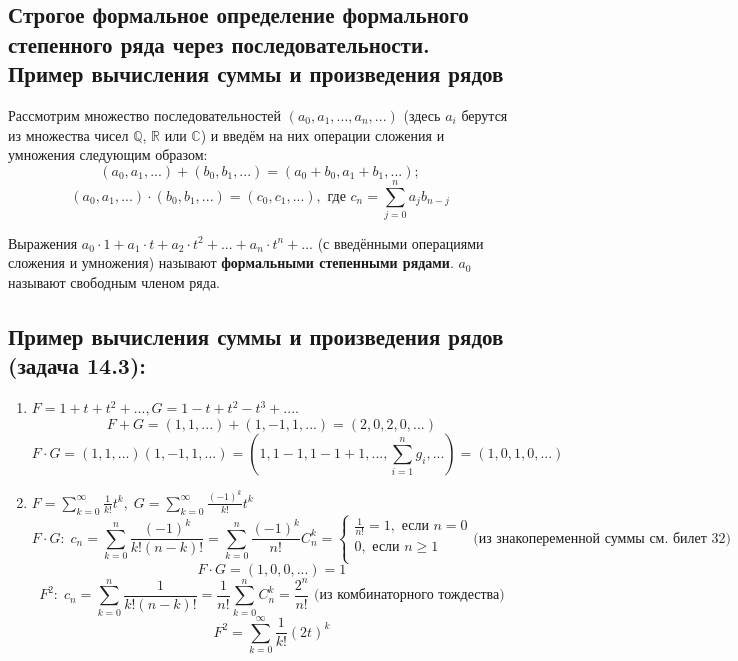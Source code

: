 \subsection*{Строгое формальное определение формального степенного ряда через последовательности. Пример вычисления суммы и произведения рядов}
\par Рассмотрим множество последовательностей $(a_0, a_1, ..., a_n, ...)$ (здесь $a_i$ берутся из множества
чисел $\mathbb{Q}$, $\mathbb{R}$ или $\mathbb{C}$) и введём на них операции сложения и умножения следующим образом:
$$(a_0, a_1, . . .) + (b_0, b_1, . . .) = (a_0 + b_0, a_1 + b_1, . . .);$$
$$(a_0, a_1, . . .) · (b_0, b_1, . . .) = (c_0, c_1, . . .),\mbox{ где } c_n =\sum\limits_{j=0}^n a_j b_{n-j}$$
\par Выражения $a_0 \cdot 1+a_1 \cdot t+a_2 \cdot t^2+. . .+a_n \cdot t^n+. . .$ (с введёнными операциями сложения и умножения) называют \textbf{формальными степенными рядами}. $a_0$ называют свободным членом ряда.
\subsection*{Пример вычисления суммы и произведения рядов (задача 14.3):}
\begin{enumerate}
    \item $F = 1 + t + t^2 + . . ., G = 1 - t + t^2 - t^3 + . . .. $
    $$F + G=(1, 1, ...) + (1, -1, 1, ...) = (2, 0, 2, 0, ...)$$
    $$F \cdot G=(1, 1, ...)(1, -1, 1, ...)=(1, 1-1, 1-1+1, ..., \sum\limits_{i=1}^n g_i, ...)=(1, 0, 1, 0,...) $$
    \item $F =\sum\limits_{k=0}^{\infty} \frac{1}{k!}t^k, \; G =\sum\limits_{k=0}^{\infty} \frac{(-1)^k}{k!}t^k$
    $$F \cdot G: \; c_n=\sum\limits_{k=0}^n \frac{(-1)^k}{k!(n-k)!}=\sum\limits_{k=0}^n \frac{(-1)^k}{n!} C_n^k=\left\{
\begin{array}{ccc}
\frac{1}{n!}=1, \mbox{ если } n=0\\
0, \mbox{ если } n \geq 1\\
\end{array}
\right. \mbox{(из знакопеременной суммы см. билет 32)}$$
$$F \cdot G = (1, 0, 0, ...)=1$$
$$F^2: \; c_n=\sum\limits_{k=0}^n \frac{1}{k!(n-k)!}=\frac{1}{n!} \sum\limits_{k=0}^n C_n^k=\frac{2^n}{n!} \mbox{ (из комбинаторного тождества)}$$
$$F^2=\sum\limits_{k=0}^{\infty} \frac{1}{k!}(2t)^k$$
\end{enumerate}